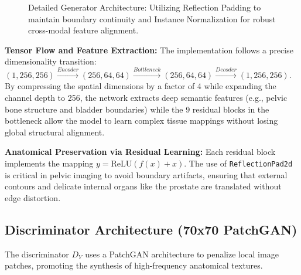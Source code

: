 \documentclass[10pt,a4paper]{article}
\begin{document}
\begin{figure}[H]
{
}
\caption{Detailed Generator Architecture: Utilizing Reflection Padding to maintain boundary continuity and Instance Normalization for robust cross-modal feature alignment.}
\end{figure}

\textbf{Tensor Flow and Feature Extraction:} 
The implementation follows a precise dimensionality transition: $(1, 256, 256) \xrightarrow{Encoder} (256, 64, 64) \xrightarrow{Bottleneck} (256, 64, 64) \xrightarrow{Decoder} (1, 256, 256)$. By compressing the spatial dimensions by a factor of 4 while expanding the channel depth to 256, the network extracts deep semantic features (e.g., pelvic bone structure and bladder boundaries) while the 9 residual blocks in the bottleneck allow the model to learn complex tissue mappings without losing global structural alignment.

\textbf{Anatomical Preservation via Residual Learning:} 
Each residual block implements the mapping $y = \text{ReLU}(f(x) + x)$. The use of \texttt{ReflectionPad2d} is critical in pelvic imaging to avoid boundary artifacts, ensuring that external contours and delicate internal organs like the prostate are translated without edge distortion.

\subsection{Discriminator Architecture (70x70 PatchGAN)}
The discriminator $D_{Y}$ uses a PatchGAN architecture to penalize local image patches, promoting the synthesis of high-frequency anatomical textures.
\end{document}
